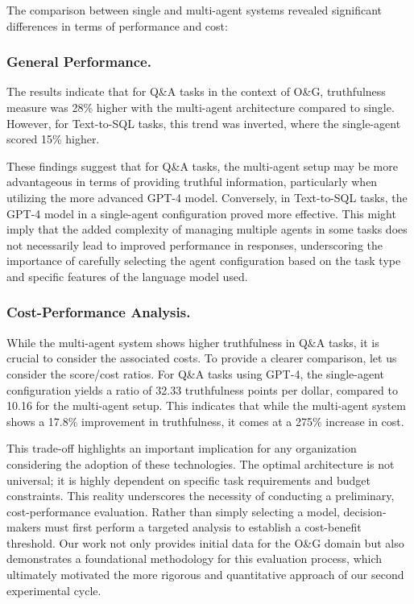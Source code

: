             The comparison between single and multi-agent systems revealed significant differences in terms of performance and cost:
            
            \subsubsection{General Performance.}     
                The results indicate that for Q\&A tasks in the context of O\&G, truthfulness measure was 28\% higher with the multi-agent architecture compared to single. 
                However, for Text-to-SQL tasks, this trend was inverted, where the single-agent scored 15\% higher.

                These findings suggest that for Q\&A tasks, the multi-agent setup may be more advantageous in terms of providing truthful information, particularly when utilizing the more advanced GPT-4 model. 
                Conversely, in Text-to-SQL tasks, the GPT-4 model in a single-agent configuration proved more effective. 
                This might imply that the added complexity of managing multiple agents in some tasks does not necessarily lead to improved performance in responses, underscoring the importance of carefully selecting the agent configuration based on the task type and specific features of the language model used.
                    
            \subsubsection{Cost-Performance Analysis.}
                While the multi-agent system shows higher truthfulness in Q\&A tasks, it is crucial to consider the associated costs. 
                To provide a clearer comparison, let us consider the score/cost ratios. For Q\&A tasks using GPT-4, the single-agent configuration yields a ratio of 32.33 truthfulness points per dollar, compared to 10.16 for the multi-agent setup. This indicates that while the multi-agent system shows a 17.8\% improvement in truthfulness, it comes at a 275\% increase in cost.

                This trade-off highlights an important implication for any organization considering the adoption of these technologies. The optimal architecture is not universal; it is highly dependent on specific task requirements and budget constraints. 
                This reality underscores the necessity of conducting a preliminary, cost-performance evaluation. Rather than simply selecting a model, decision-makers must first perform a targeted analysis to establish a cost-benefit threshold. 
                Our work not only provides initial data for the O\&G domain but also demonstrates a foundational methodology for this evaluation process, which ultimately motivated the more rigorous and quantitative approach of our second experimental cycle.


